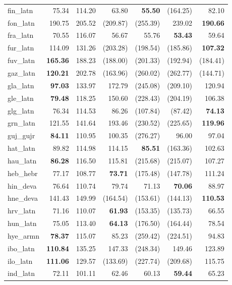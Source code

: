 \documentclass[11pt]{article}
\begin{document}
\begin{center}
\begin{longtable}[width=0.9\textwidth]{|l|rrrrrr|}
fin\_latn & 75.34 & 114.20 & 63.80 & \textbf{55.50} & (164.25) & 82.10 \\ 
fon\_latn & 190.75 & 205.52 & (209.87) & (255.39) & 239.02 & \textbf{190.66} \\ 
fra\_latn & 70.55 & 116.07 & 56.67 & 55.76 & \textbf{53.43} & 59.64 \\ 
fur\_latn & 114.09 & 131.26 & (203.28) & (198.54) & (185.86) & \textbf{107.32} \\ 
fuv\_latn & \textbf{165.36} & 188.23 & (188.00) & (201.33) & (192.94) & (184.41) \\ 
gaz\_latn & \textbf{120.21} & 202.78 & (163.96) & (260.02) & (262.77) & (144.71) \\ 
gla\_latn & \textbf{97.03} & 133.97 & 172.79 & (245.08) & (209.10) & 120.94 \\ 
gle\_latn & \textbf{79.48} & 118.25 & 150.60 & (228.43) & (204.19) & 106.38 \\ 
glg\_latn & 76.34 & 114.53 & 86.26 & (107.84) & (87.42) & \textbf{74.13} \\ 
grn\_latn & 121.55 & 141.64 & 193.46 & (230.52) & (225.65) & \textbf{119.96} \\ 
guj\_gujr & \textbf{84.11} & 110.95 & 100.35 & (276.27) & 96.00 & 97.04 \\ 
hat\_latn & 89.82 & 114.98 & 114.15 & \textbf{85.51} & (163.36) & 102.63 \\ 
hau\_latn & \textbf{86.28} & 116.50 & 115.81 & (215.68) & (215.07) & 107.27 \\ 
heb\_hebr & 77.17 & 108.77 & \textbf{73.71} & (175.48) & (147.78) & 111.24 \\ 
hin\_deva & 76.64 & 110.74 & 79.74 & 71.13 & \textbf{70.06} & 88.97 \\ 
hne\_deva & 141.43 & 149.99 & (164.54) & (153.61) & (144.13) & \textbf{110.53} \\ 
hrv\_latn & 71.16 & 110.07 & \textbf{61.93} & (153.35) & (135.73) & 66.55 \\ 
hun\_latn & 75.05 & 113.40 & \textbf{64.13} & (176.50) & (164.44) & 78.54 \\ 
hye\_armn & \textbf{78.37} & 115.07 & 85.23 & (259.42) & (224.51) & 94.83 \\ 
ibo\_latn & \textbf{110.84} & 135.25 & 147.33 & (248.34) & 149.46 & 123.89 \\ 
ilo\_latn & \textbf{111.06} & 129.57 & (133.69) & (227.74) & (209.68) & 115.75 \\ 
ind\_latn & 72.11 & 101.11 & 62.46 & 60.13 & \textbf{59.44} & 65.23 \\ 

\end{longtable}
\end{center}
\end{document}
